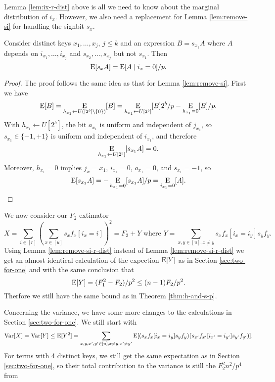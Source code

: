 Lemma \ref{lem:ix-r-dist} above is all we need to know about the
marginal distribution of $i_x$. However, we also need a replacement
for Lemma \ref{lem:remove-si} for handling the signbit $s_x$.
\begin{lemma}\label{lem:remove-si-r-dist} Consider distinct keys
   $x_1,\ldots,x_j$, $j\leq k$ and an expression $B=s_{x_1}A$ where $A$
   depends on $i_{x_1},\ldots,i_{x_j}$ and $s_{x_2},\ldots,s_{x_j}$ but not
   $s_{x_1}$. 
   Then
   \begin{equation}\label{eq:remove-si-r-dist}
      \E[s_xA]=\E[A\suchthat i_x=0]/p.
   \end{equation}
\end{lemma}
\begin{proof}
   The proof follows the same idea as that for Lemma \ref{lem:remove-si}.
   First we have
   \[\operatorname*{E}[B]=\operatorname*{E}_{h_{x_1}\gets U([2^b]\setminus\{0\})}[B]=\operatorname*{E}_{h_{x_1}\gets U[2^b]}[B]2^b/p-\operatorname*{E}_{h_{x_1}=0}[B]/p.\]
   With $h_{x_1}\gets U[2^b]$, the bit $a_{x_1}$ is uniform and 
   independent of $j_{x_1}$, so $s_{x_1}\in\{-1,+1\}$ is uniform and 
   independent of $i_{x_1}$, and therefore 
   \[\operatorname*{E}_{h_{x_1}\gets U[2^b]}[s_{x_1}A]=0.\]
   Moreover, $h_{x_1}=0$ implies $j_x={x_1}$, $i_{x_1}=0$, $a_{x_1}=0$,
   and $s_{x_1}=-1$,
   so 
   \[\operatorname*{E}[s_{x_1}A]=-\operatorname*{E}_{h_{x_1}=0}[s_{x_1}A]/p=\operatorname*{E}_{i_{x_1}=0}[A].\]
\end{proof}
We now consider our $F_2$ extimator
\[X=\sum_{i\in[r]}\left( \sum_{x\in[u]}s_x f_x[i_x=i]\right)^2\!
   =F_2+Y\mbox{ where }Y=\sum_{x,y\in[u],x\neq y}
s_x f_x[i_x=i_y]s_y f_y.\]
Using Lemma \ref{lem:remove-si-r-dist} instead of Lemma
\ref{lem:remove-si-r-dist} we get an almost identical calculation 
of the expection $\operatorname*{E}[Y]$ as
in Section \ref{sec:two-for-one} and with the same
conclusion that 
\begin{equation}\label{eq:E-Mersenne-arb-r}
   \operatorname*{E}[Y]=(F_1^2-F_2)/p^2\leq (n-1)F_2/p^2.
\end{equation}
Therfore we still have the same bound  as in Theorem \ref{thm:h-and-s-p}.

Concerning the variance, we have some more changes to the 
calculations in Section \ref{sec:two-for-one}.
We still start with
\[\operatorname*{Var}[X]=\operatorname*{Var}[Y]\leq \operatorname*{E}[Y^2]=
   \sum_{x,y,x',y'\in[u],x\neq y,x'\neq y'}\operatorname*{E}[(s_x f_x[i_x=i_y]s_y f_y)
(s_{x'}f_{x'}[i_{x'}=i_{y'}]s_{y'} f_{y'})].\] 
For terms with 4 distinct keys, we still get the same expectation
as in Section \ref{sec:two-for-one}, so their
total contribution to the variance is still the $F_2^2 n^2/p^4$ from

